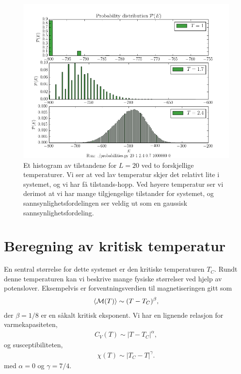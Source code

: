 \documentclass[11pt]{article}
\begin{document}
\begin{figure}[ht]
  \centering
  \includegraphics[scale=0.7]{../fig/prob_E.png}
  \caption{Et histogram av tilstandene for $L=20$ ved to 
forskjellige temperaturer. Vi ser at ved lav temperatur
skjer det relativt lite i systemet, og vi har få tilstands-hopp. Ved høyere temperatur ser vi derimot at vi har mange tilgjengelige tilstander for systemet, og 
sannsynlighetsfordelingen ser veldig ut som en gaussisk sannsynlighetsfordeling.}
\label{fig:probabilities}
\end{figure}



\section{Beregning av kritisk temperatur}
En sentral størrelse for dette systemet er den kritiske temperaturen
$T_C$. Rundt denne temperaturen kan vi beskrive mange fysiske
størrelser ved hjelp av potenslover. Eksempelvis er
forventningsverdien til magnetiseringen gitt som 
\begin{align}
  \langle \mathcal{M}(T) \rangle \sim (T - T_C)^{\beta},
\end{align}
der $\beta=1/8$ er en såkalt kritisk eksponent. Vi har en lignende
relasjon for varmekapasiteten,
\begin{align}
  C_V(T) \sim |T-T_C|^{\alpha},
\end{align}
og susceptibiliteten,
\begin{align}
  \chi(T) \sim |T_C - T|^{\gamma}.
\end{align}
med $\alpha=0$ og $\gamma=7/4$.
\end{document}
